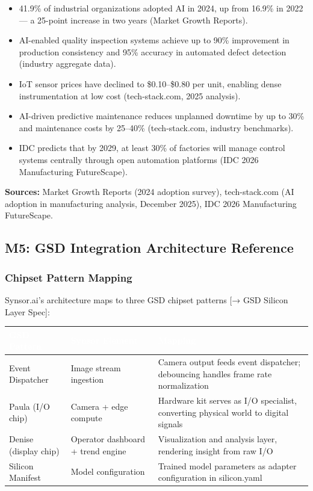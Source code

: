 \documentclass[11pt,letterpaper]{article}
\newcommand{\tableheader}[1]{\textbf{\sffamily\textcolor{white}{#1}}}
\begin{document}
\begin{itemize}[leftmargin=2em]
  \item 41.9\% of industrial organizations adopted AI in 2024, up from 16.9\% in 2022 --- a 25-point increase in two years (Market Growth Reports).
  \item AI-enabled quality inspection systems achieve up to 90\% improvement in production consistency and 95\% accuracy in automated defect detection (industry aggregate data).
  \item IoT sensor prices have declined to \$0.10--\$0.80 per unit, enabling dense instrumentation at low cost (tech-stack.com, 2025 analysis).
  \item AI-driven predictive maintenance reduces unplanned downtime by up to 30\% and maintenance costs by 25--40\% (tech-stack.com, industry benchmarks).
  \item IDC predicts that by 2029, at least 30\% of factories will manage control systems centrally through open automation platforms (IDC 2026 Manufacturing FutureScape).
\end{itemize}

\textbf{Sources:} Market Growth Reports (2024 adoption survey), tech-stack.com (AI adoption in manufacturing analysis, December 2025), IDC 2026 Manufacturing FutureScape.

\subsection{M5: GSD Integration Architecture Reference}

\subsubsection{Chipset Pattern Mapping}

Synsor.ai's architecture maps to three GSD chipset patterns [→ GSD Silicon Layer Spec]:

\begin{center}
\begin{tabularx}{\textwidth}{L{3cm}L{3.5cm}X}
\toprule
{}
\tableheader{GSD Pattern} & \tableheader{Synsor Element} & \tableheader{Mapping} \\
\midrule
Event Dispatcher & Image stream ingestion & Camera output feeds event dispatcher; debouncing handles frame rate normalization \\
Paula (I/O chip) & Camera + edge compute & Hardware kit serves as I/O specialist, converting physical world to digital signals \\
Denise (display chip) & Operator dashboard + trend engine & Visualization and analysis layer, rendering insight from raw I/O \\
Silicon Manifest & Model configuration & Trained model parameters as adapter configuration in silicon.yaml \\
\bottomrule
\end{tabularx}
\end{center}
\end{document}
